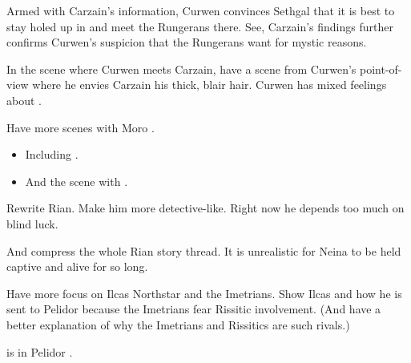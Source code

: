 \begin{garbage}
\begin{changes}
    Armed with Carzain's information, Curwen convinces Sethgal that it is best to stay holed up in \Forklin{} and meet the Rungerans there. 
    See, Carzain's findings further confirms Curwen's suspicion that the Rungerans want \Forklin{} for mystic reasons. 
    
    In the scene where Curwen meets Carzain, have a scene from Curwen's point-of-view where he envies Carzain his thick, blair hair. 
    Curwen has mixed feelings about . 
  
  \begin{comment}\paragraph{Moro \Cornel}\end{comment}
    Have more scenes with Moro \Cornel.
    \begin{itemize}
      \item 
        Including . 
      \item 
        And the scene with . 
    \end{itemize}
  
  \begin{comment}\paragraph{Rian}\end{comment}
    Rewrite Rian.
    Make him more detective-like.
    Right now he depends too much on blind luck. 
    
    And compress the whole Rian story thread. 
    It is unrealistic for Neina to be held captive and alive for so long. 
  
  \begin{comment}\paragraph{Telcastora Ilcas}\end{comment}
    Have more focus on Ilcas Northstar and the Imetrians. 
    Show Ilcas and how he is sent to Pelidor because the Imetrians fear Rissitic involvement. 
    (And have a better explanation of why the Imetrians and Rissitics are such rivals.)
  
  \begin{comment}\paragraph{\ChyrieEsmerel}\end{comment}
  \changesitem{\ChyrieEsmerel} 
    \Esmerel{} is in Pelidor . 
\end{changes}










\end{garbage}
